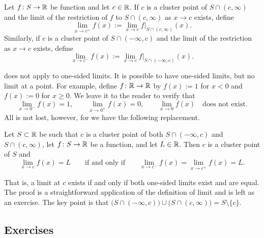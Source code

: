 \begin{defn} \label{defn:onesidedlimits}
Let $f \colon S \to {\mathbb{R}}$ be function and let $c \in {\mathbb{R}}$.  If
$c$ is a cluster point of
$S \cap (c,\infty)$
and the limit
of the restriction of $f$ to $S \cap (c,\infty)$ 
 as $x \to c$ exists, define
\begin{equation*}
\lim_{x \to c^+} f(x) := \lim_{x\to c} f|_{S \cap (c,\infty)}(x) .
\end{equation*}
Similarly, if $c$ is a cluster point of 
$S \cap (-\infty,c)$ and the limit of the restriction as $x \to c$
exists, define
\begin{equation*}
\lim_{x \to c^-} f(x) := \lim_{x\to c} f|_{S \cap (-\infty,c)}(x) .
\end{equation*}
\end{defn}

 does not apply to one-sided limits.
It is possible to have one-sided limits, but no limit at a point.  For
example, define $f \colon {\mathbb{R}} \to {\mathbb{R}}$ by $f(x) := 1$ for $x < 0$ and
$f(x) :=
0$ for $x \geq 0$.  We leave it to the reader to verify that
\begin{equation*}
\lim_{x \to 0^-} f(x) = 1, \qquad
\lim_{x \to 0^+} f(x) = 0, \qquad
\lim_{x \to 0} f(x) \quad \text{does not exist.}
\end{equation*}
All is not lost, however, for we have the following replacement.

\begin{prop} \label{prop:onesidedlimits}
Let $S \subset {\mathbb{R}}$ be such that $c$ is a cluster point
of both $S \cap (-\infty,c)$ and $S \cap (c,\infty)$, let
$f \colon S \to {\mathbb{R}}$ be a function, and let $L \in {\mathbb{R}}$.  Then $c$ is a cluster point of $S$ and
\begin{equation*}
\lim_{x \to c} f(x) = L
\qquad \text{if and only if} \qquad
\lim_{x \to c^-} f(x) =
\lim_{x \to c^+} f(x) =
L .
\end{equation*}
\end{prop}

That is, a limit at $c$ exists if and only if both one-sided limits exist and are equal.  The
proof is a straightforward application of the definition of limit
and is left as an exercise.  The key point is that
$\bigl( S \cap (-\infty,c) \bigr) \cup \bigl( S \cap (c,\infty) \bigr)
= S \setminus \{ c \}$.

\subsection{Exercises}


